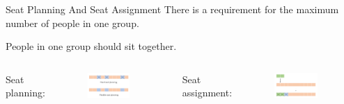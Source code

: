     \begin{frame}{Seat Planning And Seat Assignment}
      There is a requirement for the maximum number of people in one group.
      
      People in one group should sit together.
      
      \vspace{1cm}

      \begin{columns}
        \column{5cm}  %
        Seat planning: 
          \begin{figure}[ht]
            \centering
            \includegraphics[width = 0.8\textwidth]{./images/seat_planning.png}
          \end{figure}
          \column{5cm}
        Seat assignment: 
          \scriptsize
          \begin{figure}[ht]
            \centering
            \includegraphics[width = 0.8\textwidth]{./images/seat_assignment.png}
          \end{figure}
      \end{columns}
    
    \end{frame}
    

